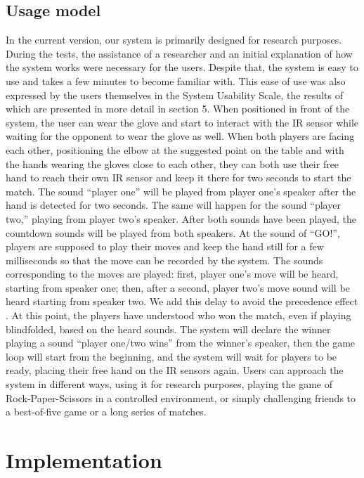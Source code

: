 \documentclass[11pt,a4paper]{report}
\begin{document}
\subsection*{Usage model}
In the current version, our system is primarily designed for research purposes. During the tests, the assistance of a researcher and an initial explanation of how the system works were necessary for the users. Despite that, the system is easy to use and takes a few minutes to become familiar with. This ease of use was also expressed by the users themselves in the System Usability Scale, the results of which are presented in more detail in section 5.
When positioned in front of the system, the user can wear the glove and start to interact with the IR sensor while waiting for the opponent to wear the glove as well. When both players are facing each other, positioning the elbow at the suggested point on the table and with the hands wearing the gloves close to each other, they can both use their free hand to reach their own IR sensor and keep it there for two seconds to start the match. The sound “player one” will be played from player one’s speaker after the hand is detected for two seconds. The same will happen for the sound “player two,” playing from player two’s speaker. After both sounds have been played, the countdown sounds will be played from both speakers. At the sound of “GO!”, players are supposed to play their moves and keep the hand still for a few milliseconds so that the move can be recorded by the system. The sounds corresponding to the moves are played: first, player one’s move will be heard, starting from speaker one; then, after a second, player two’s move sound will be heard starting from speaker two. We add this delay to avoid the precedence effect \cite*{1}. At this point, the players have understood who won the match, even if playing blindfolded, based on the heard sounds. The system will declare the winner playing a sound “player one/two wins” from the winner’s speaker, then the game loop will start from the beginning, and the system will wait for players to be ready, placing their free hand on the IR sensors again.
Users can approach the system in different ways, using it for research purposes, playing the game of Rock-Paper-Scissors in a controlled environment, or simply challenging friends to a best-of-five game or a long series of matches.

\section*{Implementation}
\end{document}
